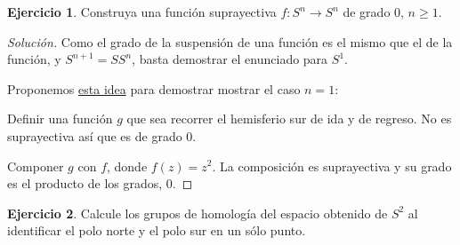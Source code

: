 \documentclass[spanish]{book}
\theoremstyle{definition}
\newtheorem*{ejer}{Ejercicio}
\begin{document}
\begin{ejer}
	Construya una función suprayectiva $f:S^n\to S^n$ de grado 0, $n\geq1$.
\end{ejer}
	\begin{proof}[Solución]
	Como el grado de la suspensión de una función es el mismo que el de la función, y $S^{n+1}=SS^n$, basta demostrar el enunciado para $S^1$.
	
	Proponemos \href{https://folk.ntnu.no/gereonq/MA3403H2018/MA3403_Exercise04_Soln.pdf}{esta idea} para demostrar mostrar el caso $n=1$:
	
	Definir una función $g$ que sea recorrer el hemisferio sur de ida y de regreso. No es suprayectiva así que es de grado 0.
	
	Componer $g$ con $f$, donde $f(z)=z^2$. La composición es suprayectiva y su grado es el producto de los grados, 0.
\end{proof}
\begin{ejer}
	Calcule los grupos de homología del espacio obtenido de $S^2$ al identificar el polo norte y el polo sur en un sólo punto.
\end{ejer}
\end{document}
